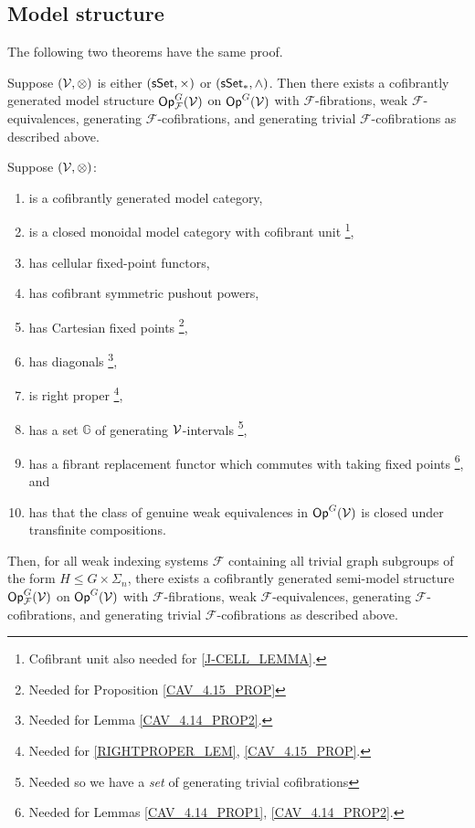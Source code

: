 \documentclass[a4paper,10pt
,draft
]{article}%
\renewcommand{\F}{\mathcal F}
\renewcommand{\1}{\ensuremath{\mathbb{id}}}
\begin{document}
\subsection{Model structure}

The following two theorems have the same proof.

\begin{theorem}
      \label{SSET_MODEL_THM}
      Suppose $(\mathcal V, \otimes)$ is either $(\mathsf{sSet}, \times)$ or $(\sSet_{\**}, \wedge)$.
      Then there exists a cofibrantly generated model structure
      $\mathsf{Op}^G_\F(\V)$ on $\mathsf{Op}^G(\mathcal V)$ with
      $\F$-fibrations, weak $\F$-equivalences, generating $\F$-cofibrations, and generating trivial $\F$-cofibrations as described above.
\end{theorem}

\begin{theorem}
      \label{MODEL_THM}
      Suppose $(\mathcal V, \otimes)$:
      \begin{enumerate}[label = (\roman*)]\itemsep-4pt
      \item is a cofibrantly generated model category,
      \item is a closed monoidal model category with cofibrant unit
            \footnote{Cofibrant unit also needed for \ref{J-CELL_LEMMA}.},
      \item has cellular fixed-point functors,
      \item \label{CSPP_LBL} has cofibrant symmetric pushout powers,
      \item has Cartesian fixed points
            \footnote{Needed for Proposition \ref{CAV_4.15_PROP}},
      \item has diagonals
            \footnote{Needed for Lemma \ref{CAV_4.14_PROP2}.},
      \item \label{RP_LBL} is right proper
            \footnote{Needed for \ref{RIGHTPROPER_LEM}, \ref{CAV_4.15_PROP}.},
      \item \label{GENSET_LBL} has a set $\mathbb{G}$ of generating $\mathcal V$-intervals
            \footnote{Needed so we have a \textit{set} of generating trivial cofibrations},
      \item \label{FBF_LBL} has a fibrant replacement functor which commutes with taking fixed points
            \footnote{Needed for Lemmas \ref{CAV_4.14_PROP1}, \ref{CAV_4.14_PROP2}.}, and
      \item \label{TCWE_LBL} has that the class of genuine weak equivalences in $\mathsf{Op}^G(\mathcal V)$ is closed under transfinite compositions.
      \end{enumerate}
      Then, for all weak indexing systems $\F$ containing all trivial graph subgroups of the form
      $H \leq G \times \Sigma_n$,
      there exists a cofibrantly generated semi-model structure $\Op^G_\F(\V)$ on $\mathsf{Op}^G(\mathcal V)$ with
      $\F$-fibrations, weak $\F$-equivalences, generating $\F$-cofibrations, and generating trivial $\F$-cofibrations as described above.


\end{theorem}
\end{document}
